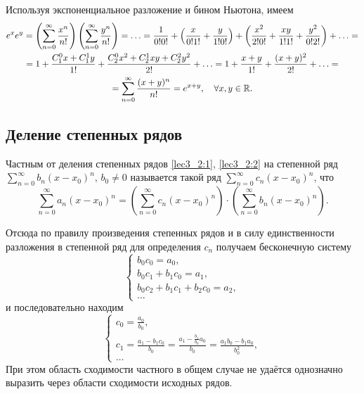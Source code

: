 \documentclass[../../main.tex]{subfiles}
\begin{document}
    \begin{example}
        Используя экспоненциальное разложение и бином Ньютона, имеем
        \begin{multline*} 
            e^xe^y = \left(\sum\limits_{n = 0}^{\infty}\frac{x^n}{n!} \right)
            \left(\sum\limits_{n = 0}^{\infty}\frac{y^n}{n!} \right) = \ldots 
            = 
            \frac{1}{0!0!} + \left(\frac x{0!1!} + \frac y {1!0!}\right) + 
            \left(\frac{x^2}{2!0!} + \frac{xy}{1!1!} + \frac{y^2}{0!2!}\right) 
            + \ldots = \\ = 1 + \frac{C_1^0 x + C_1^1 y}{1!} + \frac{C_2^0 x^2 
            + C_2^1xy + C_2^2 y^2}{2!} + \ldots = 1 + \frac{x + y}{1!} + 
            \frac{(x + y)^2}{2!} + \ldots = \\ = \sum\limits_{n = 0}^{\infty} 
            \frac{(x + y)^n}{n!} = e^{x + y}, \quad \forall x, y \in \mathbb{R}.
        \end{multline*}
    \end{example}

    \subsection{Деление степенных рядов}

    Частным от деления степенных рядов \eqref{lec3_2:1}, \eqref{lec3_2:2} на 
    степенной ряд $\sum\limits_{n = 0}^{\infty}b_n(x - x_0)^n, \, b_0 
    \ne 0$ называется такой ряд $\sum\limits_{n = 0}^{\infty}c_n(x - x_0)^n$, 
    что 
    \[\sum\limits_{n = 0}^{\infty}a_n(x - x_0)^n = 
    \left(\sum\limits_{n = 0}^{\infty}c_n(x - x_0)^n\right) \cdot 
    \left(\sum\limits_{n = 0}^{\infty}b_n(x - x_0)^n\right). \]
    
    Отсюда по правилу произведения степенных рядов и в силу единственности 
    разложения в степенной ряд для определения $c_n$ получаем бесконечную 
    систему 
    \[
    \begin{cases}
        b_0c_0 = a_0, \\ 
        b_0c_1 + b_1c_0 = a_1, \\
        b_0c_2 + b_1c_1 + b_2c_0 = a_2, \\
        \ldots
    \end{cases} 
    \]
    и последовательно находим
    \[ 
    \begin{cases}
    c_0 = \frac{a_0}{b_0}, \\ 
    c_1 = \frac{a_1 - b_1c_0}{b_0} = \frac{a_1 - \frac{b_1}{b_0}a_0}{b_0} = 
        \frac{a_1b_0-b_1a_0}{b_0^2}, \\
    \ldots
    \end{cases} 
    \]
    При этом область сходимости частного в общем случае не удаётся однозначно 
    выразить через области сходимости исходных рядов.
\end{document}
